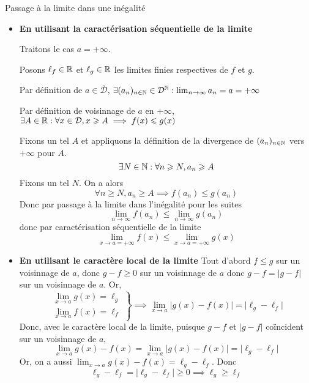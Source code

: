 \documentclass{article}
\renewenvironment{question_kholle}[2][ ]
{
	\subsection{\texorpdfstring{#2}{}}
	\notblank{#1}
	{
		\noindent #1
		\bigbreak
	}
	{}
	\begin{proof}
}
{
	\end{proof}
}
\begin{document}
{Passage à la limite dans une inégalité}
\begin{itemize}[label=$\star$]
  \item \textbf{En utilisant la caractérisation séquentielle de la limite}
  
  Traitons le cas $a = +\infty$.
  
  Posons $\ell_{f} \in\mathbb R$ et $\ell_{g} \in \mathbb R$ les limites finies respectives de $f$ et $g$.
  
  Par définition de $a \in \overline{\mathcal{D}}$, $\exists (a_{n})_{n \in \mathbb N} \in \mathcal{D}^{\mathbb N} : \lim_{ n \to \infty }a_{n} = a = +\infty$
  
  Par définition de voisinnage de $a$ en $+\infty$, $\exists A \in \mathbb R : \forall x \in \mathcal{D}, x\geqslant A \implies f(x) \leqslant g(x)$
  
  Fixons un tel $A$ et appliquons la définition de la divergence de $(a_{n})_{n \in \mathbb N}$ vers $+\infty$ pour $A$.
  $$
  \exists N \in \mathbb N : \forall n \geqslant N, a_{n} \geqslant A
  $$
  Fixons un tel $N$. On a alors
  $$
  \forall n \geqslant N, a_{n} \geqslant A \implies f(a_{n}) \leqslant g(a_{n})
  $$
  Donc par passage à la limite dans l'inégalité pour les suites
  $$
  \lim_{ n \to \infty } f(a_{n}) \leqslant \lim_{ n \to \infty } g(a_{n})
  $$
  donc par caractérisation séquentielle de la limite
  $$
  \lim_{ x \to a=+\infty}  f(x) \leqslant \lim_{ x \to a  = +\infty} g(x) 
  $$

  \item \textbf{En utilisant le caractère local de la limite}
  Tout d'abord $f \leqslant g$ sur un voisinnage de $a$, donc $g - f \geqslant 0$ sur un voisinnage de $a$ donc $g-f = \lvert g-f \rvert$ sur un voisinnage de $a$.
  Or,
  $$
  \left. \begin{array}{ll}
  \lim_{ x \to a }g(x) = \ell_{g} \\
  \lim_{ x \to a } f(x) = \ell_{f}
  \end{array}\right\}
  \implies \lim_{ x \to a } \lvert g(x) - f(x) \rvert  = \lvert \ell_{g} - \ell _{f} \rvert 
  $$
  Donc, avec le caractère local de la limite, puisque $g-f$ et $|g-f|$ coïncident sur un voisinnage de $a$,
  $$
  \lim_{ x \to a } g(x) - f(x) = \lim_{ x \to a } \lvert g(x) - f(x) \rvert  = \lvert \ell_{g} - \ell_{f} \rvert 
  $$
  Or,  on a aussi $\lim_{ x \to a }g(x) - f(x) = \ell_{g} - \ell_{f}$.
  Donc
  $$
  \ell_{g} - \ell_{f} = \lvert \ell_{g} - \ell_{f} \rvert \geqslant 0 \implies \ell_{g} \geqslant \ell_{f}
  $$
  \end{itemize}
\end{question_kholle}
\end{document}
